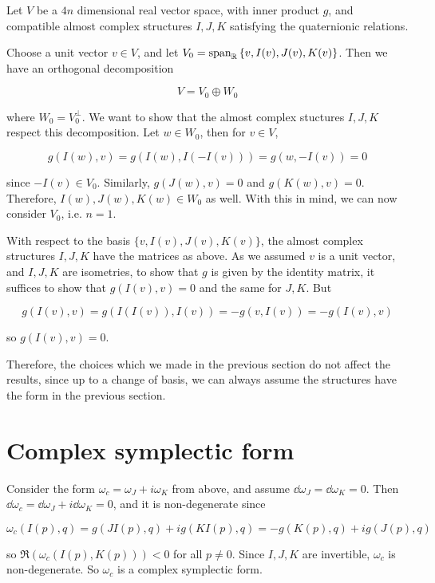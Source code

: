 \documentclass{article}
\begin{document}
Let \(V\) be a \(4n\) dimensional real vector space, with inner product \(g\), and compatible almost complex structures \(I, J, K\) satisfying the quaternionic relations.

Choose a unit vector \(v \in V\), and let \(V_0 = \operatorname{span}_{\mathbb{R}}\left\{v, I(v), J(v), K(v)\right\}\). Then we have an orthogonal decomposition

\[V = V_0 \oplus W_0\]

where \(W_0 = V_0^\perp\). We want to show that the almost complex stuctures \(I, J, K\) respect this decomposition. Let \(w \in W_0\), then for \(v \in V\),

\[g(I(w), v) = g(I(w), I(-I(v))) = g(w, -I(v)) = 0\]

since \(-I(v) \in V_0\). Similarly, \(g(J(w), v) = 0\) and \(g(K(w), v) = 0\). Therefore, \(I(w), J(w), K(w) \in W_0\) as well. With this in mind, we can now consider \(V_0\), i.e. \(n = 1\).

With respect to the basis \(\{v, I(v), J(v), K(v)\}\), the almost complex structures \(I, J, K\) have the matrices as above. As we assumed \(v\) is a unit vector, and \(I, J, K\) are isometries, to show that \(g\) is given by the identity matrix, it suffices to show that \(g(I(v), v) = 0\) and the same for \(J, K\). But

\[g(I(v), v) = g(I(I(v)), I(v)) = -g(v, I(v)) = -g(I(v), v)\]

so \(g(I(v), v) = 0\).

Therefore, the choices which we made in the previous section do not affect the results, since up to a change of basis, we can always assume the structures have the form in the previous section.

\section{Complex symplectic form}

Consider the form \(\omega_c = \omega_J + i\omega_K\) from above, and assume \(\dd\omega_J = \dd\omega_K = 0\). Then \(\dd\omega_c = \dd\omega_J + i\dd\omega_K = 0\), and it is non-degenerate since

\[\omega_c(I(p), q) = g(JI(p), q) + ig(KI(p), q) = -g(K(p), q) + ig(J(p), q)\]

so \(\Re(\omega_c(I(p), K(p))) < 0\) for all \(p \ne 0\). Since \(I, J, K\) are invertible, \(\omega_c\) is non-degenerate. So \(\omega_c\) is a complex symplectic form.
\end{document}
